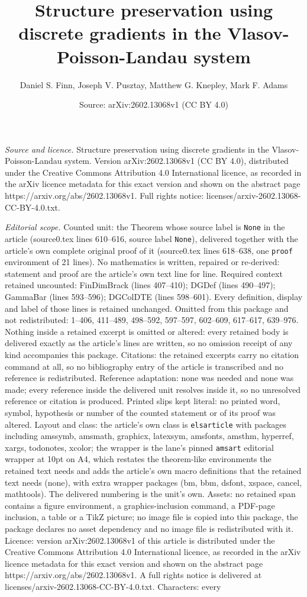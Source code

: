 \documentclass[10pt,a4paper]{amsart}
\title[Structure preservation using discrete gradients in the Vlaso]{Structure preservation using discrete gradients in the Vlasov-Poisson-Landau system}
\author{Daniel S. Finn, Joseph V. Pusztay, Matthew G. Knepley, Mark F. Adams}
\date{Source: arXiv:2602.13068v1 (CC BY 4.0)}
\begin{document}
\maketitle

\noindent\emph{Source and licence.} Structure preservation using discrete gradients in the Vlasov-Poisson-Landau system. Version arXiv:2602.13068v1 (CC BY 4.0), distributed under the Creative Commons Attribution 4.0 International licence, as recorded in the arXiv licence metadata for this exact version and shown on the abstract page https://arxiv.org/abs/2602.13068v1. Full rights notice: licenses/arxiv-2602.13068-CC-BY-4.0.txt.\par\smallskip

\noindent\textit{Editorial scope.} Counted unit: the Theorem whose source label is \texttt{None} in the article (source0.tex lines 610--616, source label \texttt{None}), delivered together with the article's own complete original proof of it (source0.tex lines 618--638, one \texttt{proof} environment of 21 lines). No mathematics is written, repaired or re-derived: statement and proof are the article's own text line for line. Required context retained uncounted: FinDimBrack (lines 407--410); DGDef (lines 490--497); GammaBar (lines 593--596); DGColDTE (lines 598--601). Every definition, display and label of those lines is retained unchanged. Omitted from this package and not redistributed: 1--406, 411--489, 498--592, 597--597, 602--609, 617--617, 639--976. Nothing inside a retained excerpt is omitted or altered: every retained body is delivered exactly as the article's lines are written, so no omission receipt of any kind accompanies this package. Citations: the retained excerpts carry no citation command at all, so no bibliography entry of the article is transcribed and no reference is redistributed. Reference adaptation: none was needed and none was made; every reference inside the delivered unit resolves inside it, so no unresolved reference or citation is produced. Printed slips kept literal: no printed word, symbol, hypothesis or number of the counted statement or of its proof was altered. Layout and class: the article's own class is \texttt{elsarticle} with packages including amssymb, amsmath, graphicx, latexsym, amsfonts, amsthm, hyperref, xargs, todonotes, xcolor; the wrapper is the lane's pinned \texttt{amsart} editorial wrapper at 10pt on A4, which restates the theorem-like environments the retained text needs and adds the article's own macro definitions that the retained text needs (none), with extra wrapper packages (bm, bbm, dsfont, xspace, cancel, mathtools). The delivered numbering is the unit's own. Assets: no retained span contains a figure environment, a graphics-inclusion command, a PDF-page inclusion, a table or a TikZ picture; no image file is copied into this package, the package declares no asset dependency and no image file is redistributed with it. Licence: version arXiv:2602.13068v1 of this article is distributed under the Creative Commons Attribution 4.0 International licence, as recorded in the arXiv licence metadata for this exact version and shown on the abstract page https://arxiv.org/abs/2602.13068v1. A full rights notice is delivered at licenses/arxiv-2602.13068-CC-BY-4.0.txt. Characters: every 
\end{document}
